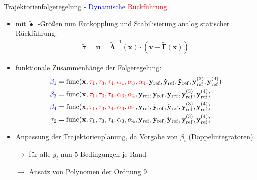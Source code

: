 \documentclass[
	ngerman,
	10pt,				%
	aspectratio=169, 	%
	xcolor=dvipsnames
]{beamer}
\begin{document}
\begin{frame}[t,fragile,label=trajektorienregelung_6]{\large Trajektorienfolgeregelung - \textcolor{blue}{Dynamische} \textcolor{red}{Rückführung}}
	
	\begin{itemize}
		\item mit $\tilde{\bullet}$~-Größen nun Entkopplung und Stabilisierung analog statischer Rückführung:
		\begin{align*}
		\tilde{\boldsymbol{\tau}} = \mathbf{u} = \tilde{\boldsymbol{\Lambda }}^{-1}(\mathbf{x}) \cdot (\mathbf{v} - \tilde{\boldsymbol{\Gamma}}(\mathbf{x}))
		\end{align*}
		\pause
		\item funktionale Zusammenhänge der Folgeregelung:
		\begin{align*}
		\textcolor{blue}{\beta_1} &= \mathrm{func}(\mathbf{x}, \textcolor{red}{\tau_1, \tau_3, \tau_4, \alpha_1, \alpha_3, \alpha_4}, \mathbf{y}_{\mathrm{ref}}, \dot{\mathbf{y}}_{\mathrm{ref}}, \ddot{\mathbf{y}}_{\mathrm{ref}}, \mathbf{y}_{\mathrm{ref}}^{(3)}, \mathbf{y}_{\mathrm{ref}}^{(4)}) \\
		\textcolor{blue}{\beta_3} &= \mathrm{func}(\mathbf{x}, \textcolor{red}{\tau_1, \tau_3, \tau_4, \alpha_3, \alpha_4}, \mathbf{y}_{\mathrm{ref}}, \dot{\mathbf{y}}_{\mathrm{ref}}, \ddot{\mathbf{y}}_{\mathrm{ref}}, \mathbf{y}_{\mathrm{ref}}^{(3)}, \mathbf{y}_{\mathrm{ref}}^{(4)}) \\
		\textcolor{blue}{\beta_4} &= \mathrm{func}(\mathbf{x}, \textcolor{red}{\tau_1, \tau_3, \tau_4, \alpha_3, \alpha_4}, \mathbf{y}_{\mathrm{ref}}, \dot{\mathbf{y}}_{\mathrm{ref}}, \ddot{\mathbf{y}}_{\mathrm{ref}}, \mathbf{y}_{\mathrm{ref}}^{(3)}, \mathbf{y}_{\mathrm{ref}}^{(4)}) \\
		\tau_2 &= \mathrm{func}(\mathbf{x}, \tau_1, \tau_3, \tau_4, \alpha_3, \alpha_4, \mathbf{y}_{\mathrm{ref}}, \dot{\mathbf{y}}_{\mathrm{ref}}, \ddot{\mathbf{y}}_{\mathrm{ref}}, \mathbf{y}_{\mathrm{ref}}^{(3)}, \mathbf{y}_{\mathrm{ref}}^{(4)})
		\end{align*}
		\pause
		\item Anpassung der Trajektorienplanung, da Vorgabe von $\beta_i$ (Doppelintegratoren)
		\pause
		\item[$\rightarrow$] für alle $y_i$ nun 5 Bedingungen je Rand
		\item[$\rightarrow$] Ansatz von Polynomen der Ordnung 9
	\end{itemize}
	
\end{frame}
\end{document}
